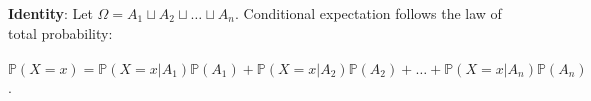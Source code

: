 \documentclass{article}
\begin{document}
			\textbf{Identity}: Let $\Omega = A_1 \sqcup A_2 \sqcup \ldots \sqcup A_n$. Conditional expectation follows the law of total probability:  \\
			\\
			$\mathbb{P}(X = x) = \mathbb{P}(X = x | A_1) \mathbb{P}(A_1) + \mathbb{P}(X = x | A_2) \mathbb{P}(A_2) + \ldots + \mathbb{P}(X = x | A_n) \mathbb{P}(A_n)$. \\
			\\
\end{document}
